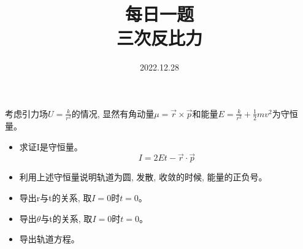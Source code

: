 \documentclass{ctexart}
\title {每日一题 \\ {\small 三次反比力}}
\date{2022.12.28}
\begin{document}
    \maketitle{}



    考虑引力场\(U = \frac{k}{r^2}\)的情况, 显然有角动量\(\mu = \vec{r} \times \vec{p} \)和能量\(E = \frac{k}{r^2} + \frac{1}{2}m v^2 \)为守恒量。
    \begin{itemize}
        \item 求证I是守恒量。
            \begin{equation}
                I = 2Et - \vec{r} \cdot \vec{p}
            \end{equation}
        \item 利用上述守恒量说明轨道为圆, 发散, 收敛的时候, 能量的正负号。
        \item 导出r与t的关系, 取\(I=0\)时\(t=0\)。
        \item 导出\(\theta\)与t的关系, 取\(I=0\)时\(t=0\)。
        \item 导出轨道方程。
    \end{itemize}
    
\end{document}
